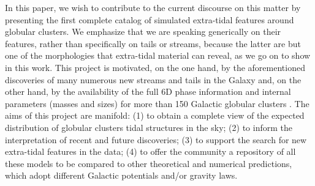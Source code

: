 In this paper, we wish to contribute to the current discourse on this matter by presenting the first complete catalog of simulated extra-tidal features around globular clusters. We emphasize that we are speaking generically on their features, rather than specifically on tails or streams, because the latter are but one of the morphologies that extra-tidal material can reveal, as we go on to show in this work. This project is motivated, on the one hand, by the aforementioned discoveries of many numerous new streams and  tails in the Galaxy and, on the other hand, by the availability of the full 6D phase information and internal parameters (masses and sizes) for more than 150 Galactic globular clusters \citep{2018MNRAS.478.1520B, 2021MNRAS.505.5957B, 2021MNRAS.501.2279V}. The aims of this project are manifold: (1) to obtain a complete view of the expected distribution of globular clusters tidal structures in the sky; (2) to inform the interpretation of recent and future discoveries; (3) to support the search for new extra-tidal features in the data; (4) to offer the community a repository of all these models to be compared to other theoretical and numerical predictions, which adopt different Galactic potentials and/or gravity laws.    